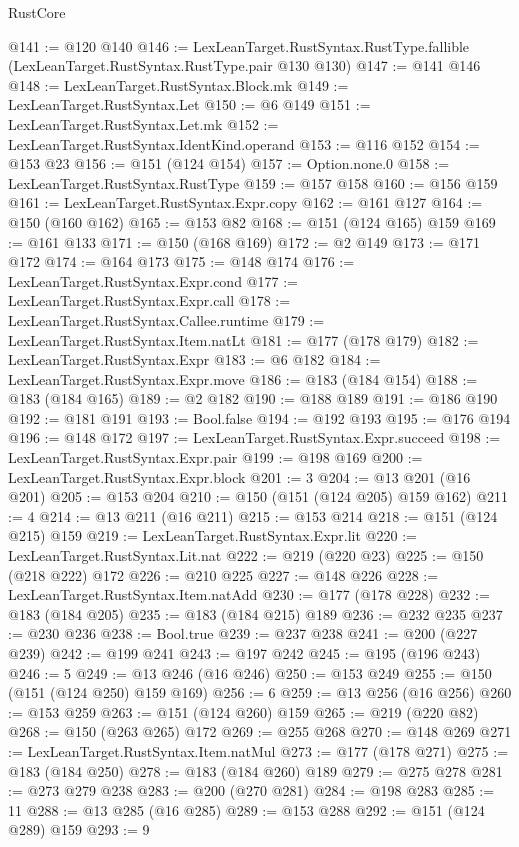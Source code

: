 \begin{lexlean}{RustCore}
\begin{coremodule}
@141 := @120 @140
@146 := LexLeanTarget.RustSyntax.RustType.fallible
    (LexLeanTarget.RustSyntax.RustType.pair @130 @130)
@147 := @141 @146
@148 := LexLeanTarget.RustSyntax.Block.mk
@149 := LexLeanTarget.RustSyntax.Let
@150 := @6 @149
@151 := LexLeanTarget.RustSyntax.Let.mk
@152 := LexLeanTarget.RustSyntax.IdentKind.operand
@153 := @116 @152
@154 := @153 @23
@156 := @151 (@124 @154)
@157 := Option.none.{0}
@158 := LexLeanTarget.RustSyntax.RustType
@159 := @157 @158
@160 := @156 @159
@161 := LexLeanTarget.RustSyntax.Expr.copy
@162 := @161 @127
@164 := @150 (@160 @162)
@165 := @153 @82
@168 := @151 (@124 @165) @159
@169 := @161 @133
@171 := @150 (@168 @169)
@172 := @2 @149
@173 := @171 @172
@174 := @164 @173
@175 := @148 @174
@176 := LexLeanTarget.RustSyntax.Expr.cond
@177 := LexLeanTarget.RustSyntax.Expr.call
@178 := LexLeanTarget.RustSyntax.Callee.runtime
@179 := LexLeanTarget.RustSyntax.Item.natLt
@181 := @177 (@178 @179)
@182 := LexLeanTarget.RustSyntax.Expr
@183 := @6 @182
@184 := LexLeanTarget.RustSyntax.Expr.move
@186 := @183 (@184 @154)
@188 := @183 (@184 @165)
@189 := @2 @182
@190 := @188 @189
@191 := @186 @190
@192 := @181 @191
@193 := Bool.false
@194 := @192 @193
@195 := @176 @194
@196 := @148 @172
@197 := LexLeanTarget.RustSyntax.Expr.succeed
@198 := LexLeanTarget.RustSyntax.Expr.pair
@199 := @198 @169
@200 := LexLeanTarget.RustSyntax.Expr.block
@201 := 3
@204 := @13 @201 (@16 @201)
@205 := @153 @204
@210 := @150 (@151 (@124 @205) @159 @162)
@211 := 4
@214 := @13 @211 (@16 @211)
@215 := @153 @214
@218 := @151 (@124 @215) @159
@219 := LexLeanTarget.RustSyntax.Expr.lit
@220 := LexLeanTarget.RustSyntax.Lit.nat
@222 := @219 (@220 @23)
@225 := @150 (@218 @222) @172
@226 := @210 @225
@227 := @148 @226
@228 := LexLeanTarget.RustSyntax.Item.natAdd
@230 := @177 (@178 @228)
@232 := @183 (@184 @205)
@235 := @183 (@184 @215) @189
@236 := @232 @235
@237 := @230 @236
@238 := Bool.true
@239 := @237 @238
@241 := @200 (@227 @239)
@242 := @199 @241
@243 := @197 @242
@245 := @195 (@196 @243)
@246 := 5
@249 := @13 @246 (@16 @246)
@250 := @153 @249
@255 := @150 (@151 (@124 @250) @159 @169)
@256 := 6
@259 := @13 @256 (@16 @256)
@260 := @153 @259
@263 := @151 (@124 @260) @159
@265 := @219 (@220 @82)
@268 := @150 (@263 @265) @172
@269 := @255 @268
@270 := @148 @269
@271 := LexLeanTarget.RustSyntax.Item.natMul
@273 := @177 (@178 @271)
@275 := @183 (@184 @250)
@278 := @183 (@184 @260) @189
@279 := @275 @278
@281 := @273 @279 @238
@283 := @200 (@270 @281)
@284 := @198 @283
@285 := 11
@288 := @13 @285 (@16 @285)
@289 := @153 @288
@292 := @151 (@124 @289) @159
@293 := 9

\end{coremodule}
\end{lexlean}
